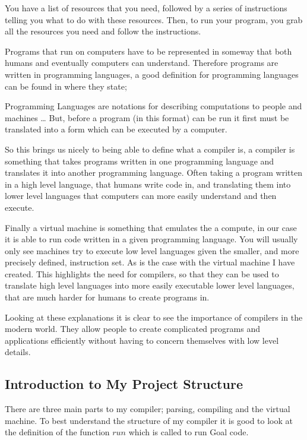 You have a list of resources that you need, followed by a series of instructions telling you what to do with these resources. Then, to run your program, you grab all the resources you need and follow the instructions.

Programs that run on computers have to be represented in someway that both humans and eventually computers can understand.  Therefore programs are written in programming languages, a good definition for programming languages can be found in  \cite[p,~1]{Comp2007}  where they state;

\begin{displayquote}
Programming Languages are notations for describing computations to people and machines … But, before a program (in this format) can be run it first must be translated into a form which can be executed by a computer.
\end{displayquote}

So this brings us nicely to being able to define what a compiler is, a compiler is something that takes programs written in one programming language and translates it into another programming language. Often taking a program written in a high level language, that humans write code in, and translating them into lower level languages that computers can more easily understand and then execute.

Finally a virtual machine is something that emulates the a compute, in our case it is able to run code written in a given programming language. You will usually only see machines try to execute low level languages given the smaller, and more precisely defined, instruction set. As is the case with the virtual machine I have created. This highlights the need for compilers, so that they can be used to translate high level languages into more easily executable lower level languages, that are much harder for humans to create programs in. 

Looking at these explanations it is clear to see the importance of compilers in the modern world. They allow people to create complicated programs and applications efficiently without having to concern themselves with low level details.

\subsection{Introduction to My Project Structure}

There are three main parts to my compiler; parsing, compiling and the virtual machine. To best understand the structure of my compiler it is good to look at the definition of the function $run$ which is called to run Goal code.

